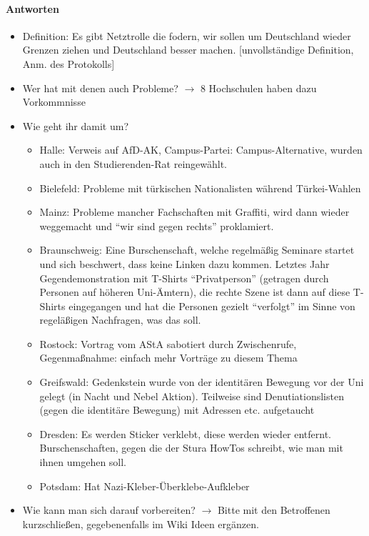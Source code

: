       \paragraph{Antworten}
        \begin{itemize}
          \item Definition: Es gibt Netztrolle die fodern, wir sollen um Deutschland wieder Grenzen ziehen und Deutschland besser machen. [unvollständige Definition, Anm. des Protokolls]
          \item Wer hat mit denen auch Probleme? $\rightarrow$ 8 Hochschulen haben dazu Vorkommnisse
          \item Wie geht ihr damit um?
            \begin{itemize}
              \item Halle: Verweis auf AfD-AK, Campus-Partei: Campus-Alternative, wurden auch in den Studierenden-Rat reingewählt.
              \item Bielefeld: Probleme mit türkischen Nationalisten während Türkei-Wahlen
              \item Mainz: Probleme mancher Fachschaften mit Graffiti, wird dann wieder weggemacht und “wir sind gegen rechts” proklamiert.
              \item Braunschweig: Eine Burschenschaft, welche regelmäßig Seminare startet und sich beschwert, dass keine Linken dazu kommen. Letztes Jahr Gegendemonstration mit T-Shirts “Privatperson” (getragen durch Personen auf höheren Uni-Ämtern), die rechte Szene ist dann auf diese T-Shirts eingegangen und hat die Personen gezielt “verfolgt” im Sinne von regeläßigen Nachfragen, was das soll.
              \item Rostock: Vortrag vom AStA sabotiert durch Zwischenrufe, Gegenmaßnahme: einfach mehr Vorträge zu diesem Thema
              \item Greifswald: Gedenkstein wurde von der identitären Bewegung vor der Uni gelegt (in Nacht und Nebel Aktion). Teilweise sind Denutiationslisten (gegen die identitäre Bewegung) mit Adressen etc. aufgetaucht
              \item Dresden: Es werden Sticker verklebt, diese werden wieder entfernt. Burschenschaften, gegen die der Stura HowTos schreibt, wie man mit ihnen umgehen soll.
              \item Potsdam: Hat Nazi-Kleber-Überklebe-Aufkleber
            \end{itemize}
          \item Wie kann man sich darauf vorbereiten? $\rightarrow$ Bitte mit den Betroffenen kurzschließen, gegebenenfalls im Wiki Ideen ergänzen.
        \end{itemize}


